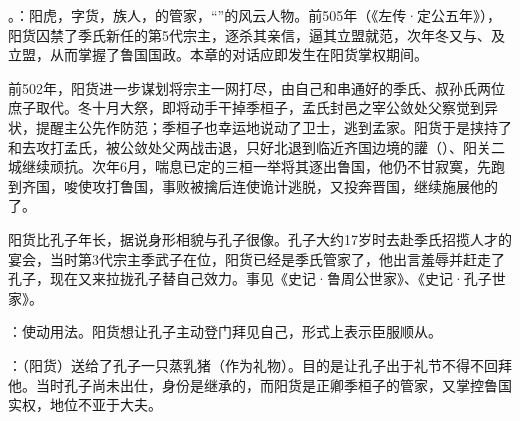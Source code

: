 {
\item {}。：阳虎，字货，族人，的管家，“”的风云人物。前505年（《左传·定公五年》），阳货囚禁了季氏新任的第5代宗主，逐杀其亲信，逼其立盟就范，次年冬又与、及立盟，从而掌握了鲁国国政。本章的对话应即发生在阳货掌权期间。%

前502年，阳货进一步谋划将宗主一网打尽，由自己和串通好的季氏、叔孙氏两位庶子取代。冬十月大祭，即将动手干掉季桓子，孟氏封邑之宰公敛处父察觉到异状，提醒主公先作防范；季桓子也幸运地说动了卫士，逃到孟家。阳货于是挟持了和去攻打孟氏，被公敛处父两战击退，只好北退到临近齐国边境的讙（）、阳关二城继续顽抗。次年6月，喘息已定的三桓一举将其逐出鲁国，他仍不甘寂寞，先跑到齐国，唆使攻打鲁国，事败被擒后连使诡计逃脱，又投奔晋国，继续施展他的了。

阳货比孔子年长，据说身形相貌与孔子很像。孔子大约17岁时去赴季氏招揽人才的宴会，当时第3代宗主季武子在位，阳货已经是季氏管家了，他出言羞辱并赶走了孔子，现在又来拉拢孔子替自己效力。事见《史记·鲁周公世家》、《史记·孔子世家》。

：使动用法。阳货想让孔子主动登门拜见自己，形式上表示臣服顺从。

\item {}：（阳货）送给了孔子一只蒸乳猪（作为礼物）。目的是让孔子出于礼节不得不回拜他。当时孔子尚未出仕，身份是继承的，而阳货是正卿季桓子的管家，又掌控鲁国实权，地位不亚于大夫。

}
